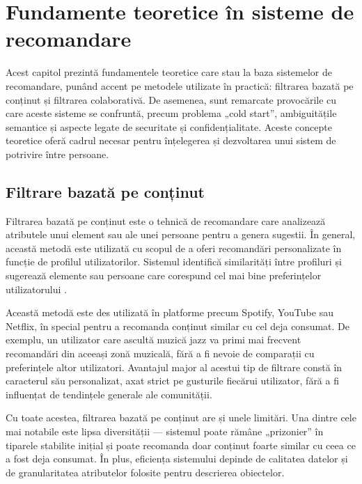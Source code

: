 \chapter{Fundamente teoretice în sisteme de recomandare}
\label{chap:ch3}

Acest capitol prezintă fundamentele teoretice care stau la baza sistemelor de recomandare, punând accent pe metodele utilizate în practică: filtrarea bazată pe conținut și filtrarea colaborativă.
De asemenea, sunt remarcate provocările cu care aceste sisteme se confruntă, precum problema „cold start”, ambiguitățile semantice și aspecte legate de securitate și confidențialitate.
Aceste concepte teoretice oferă cadrul necesar pentru înțelegerea și dezvoltarea unui sistem de potrivire între persoane.

\section{Filtrare bazată pe conținut}
\label{sec:ch3sec1}

Filtrarea bazată pe conținut este o tehnică de recomandare care analizează atributele unui element sau ale unei persoane pentru a genera sugestii.
În general, această metodă este utilizată cu scopul de a oferi recomandări personalizate în funcție de profilul utilizatorilor.
Sistemul identifică similarități între profiluri și sugerează elemente sau persoane care corespund cel mai bine preferințelor utilizatorului \cite{kumar2018recommendation}.
\par
Această metodă este des utilizată în platforme precum Spotify, YouTube sau Netflix, în special pentru a recomanda conținut similar cu cel deja consumat. 
De exemplu, un utilizator care ascultă muzică jazz va primi mai frecvent recomandări din aceeași zonă muzicală, fără a fi nevoie de comparații cu preferințele altor utilizatori. 
Avantajul major al acestui tip de filtrare constă în caracterul său personalizat, axat strict pe gusturile fiecărui utilizator, fără a fi influențat de tendințele generale ale comunității.
\par
Cu toate acestea, filtrarea bazată pe conținut are și unele limitări. 
Una dintre cele mai notabile este lipsa diversității — sistemul poate rămâne „prizonier” în tiparele stabilite inițial și poate recomanda doar conținut foarte similar cu ceea ce a fost deja consumat. 
În plus, eficiența sistemului depinde de calitatea datelor și de granularitatea atributelor folosite pentru descrierea obiectelor.

